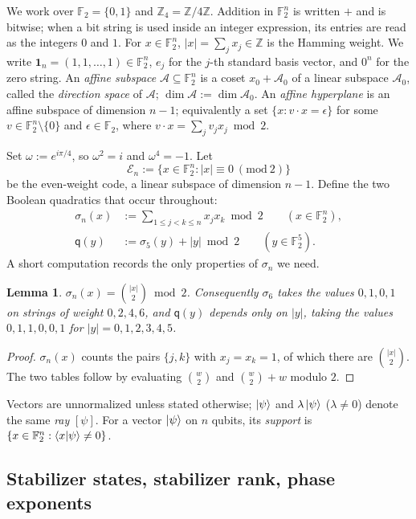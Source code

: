 \documentclass[11pt]{article}
\theoremstyle{plain}
\newtheorem{lemma}[theorem]{Lemma}
\theoremstyle{definition}
\newcommand{\F}{\mathbb{F}}
\newcommand{\Z}{\mathbb{Z}}
\newcommand{\qq}{\mathsf{q}}
\newcommand{\Ev}{\mathcal{E}}
\newcommand{\one}{\mathbf{1}}
\newcommand{\wt}[1]{\lvert #1\rvert}
\begin{document}
We work over $\F_2=\{0,1\}$ and $\Z_4=\Z/4\Z$. Addition in $\F_2^n$ is written $+$ and
is bitwise; when a bit string is used inside an integer expression, its entries are
read as the integers $0$ and $1$. For $x\in\F_2^n$, $\wt{x}=\sum_j x_j\in\Z$ is the
Hamming weight. We write $\one_n=(1,1,\dots,1)\in\F_2^n$, $e_j$ for the $j$-th standard
basis vector, and $0^n$ for the zero string. An \emph{affine subspace}
$\mathcal A\subseteq\F_2^n$ is a coset $x_0+\mathcal A_0$ of a linear subspace
$\mathcal A_0$, called the \emph{direction space} of $\mathcal A$; $\dim\mathcal A:=\dim\mathcal A_0$.
An \emph{affine hyperplane} is an affine subspace of dimension $n-1$; equivalently a set
$\{x:v\cdot x=\epsilon\}$ for some $v\in\F_2^n\setminus\{0\}$ and $\epsilon\in\F_2$,
where $v\cdot x=\sum_j v_jx_j \bmod 2$.

Set $\omega:=e^{i\pi/4}$, so $\omega^2=i$ and $\omega^4=-1$. Let
\[
\Ev_n:=\{x\in\F_2^n:\wt{x}\equiv0\ (\mathrm{mod}\ 2)\}
\]
be the even-weight code, a linear subspace of dimension $n-1$. Define the two Boolean
quadratics that occur throughout:
\begin{align}
\sigma_n(x)&:=\sum_{1\le j<k\le n}x_jx_k \bmod 2 \qquad (x\in\F_2^n),\label{eq:sigma}\\
\qq(y)&:=\sigma_5(y)+\wt{y} \bmod 2 \qquad (y\in\F_2^5).\label{eq:qdef}
\end{align}
A short computation records the only properties of $\sigma_n$ we need.

\begin{lemma}\label{lem:sigma}
$\sigma_n(x)=\binom{\wt x}{2}\bmod 2$. Consequently $\sigma_6$ takes the values
$0,1,0,1$ on strings of weight $0,2,4,6$, and $\qq(y)$ depends only on $\wt y$,
taking the values $0,1,1,0,0,1$ for $\wt y=0,1,2,3,4,5$.
\end{lemma}

\begin{proof}
$\sigma_n(x)$ counts the pairs $\{j,k\}$ with $x_j=x_k=1$, of which there are
$\binom{\wt x}{2}$. The two tables follow by evaluating
$\binom{w}{2}$ and $\binom w2+w$ modulo $2$.
\end{proof}

Vectors are unnormalized unless stated otherwise; $\ket\psi$ and $\lambda\ket\psi$
($\lambda\ne0$) denote the same \emph{ray} $[\psi]$. For a vector $\ket\psi$ on $n$
qubits, its \emph{support} is $\{x\in\F_2^n:\braket{x|\psi}\ne0\}$.

\subsection{Stabilizer states, stabilizer rank, phase exponents}
\end{document}
